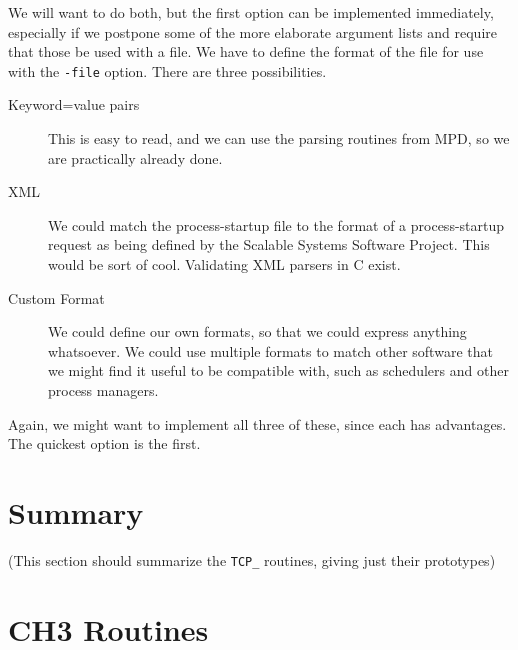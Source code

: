 \documentclass{article}
\def\code#1{\texttt{#1}}
\begin{document}
We will want to do both, but the first option can be implemented
immediately, especially if we postpone some of the more elaborate argument
lists and require that those be used with a file.  We have to define the
format of the file for use with the \code{-file} option.  There are three
possibilities.
\begin{description}
\item[Keyword=value pairs] This is easy to read, and we can use the
  parsing routines from MPD, so we are practically already done.
\item[XML] We could match the process-startup file to the format of a
  process-startup request as being defined by the Scalable Systems Software
  Project.  This would be sort of cool.  Validating XML parsers in C exist.
\item[Custom Format] We could define our own formats, so that we could express
  anything whatsoever.  We could use multiple formats to match other software
  that we might find it useful to be compatible with, such as schedulers and
  other process managers.
\end{description}

Again, we might want to implement all three of these, since each has
advantages.  The quickest option is the first.


\section{Summary}
\label{sec:tcpadi-summary}
(This section should summarize the \code{TCP_} routines, giving just their prototypes)

\appendix
\section{CH3 Routines}
\label{app:ch3}
\end{document}
